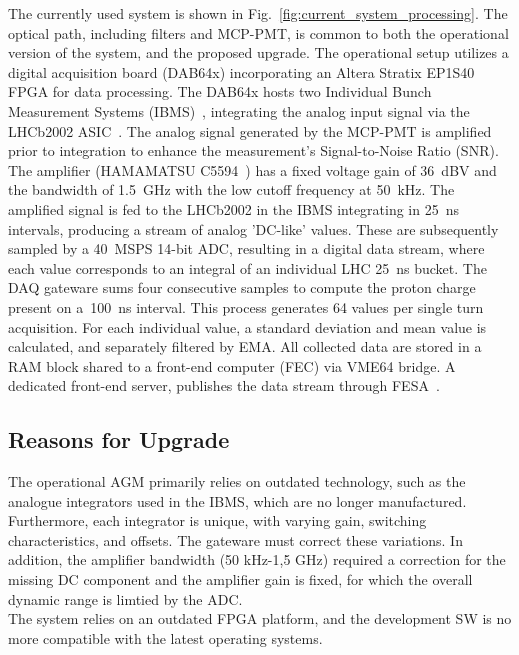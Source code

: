 The currently used system is shown in Fig.~\ref{fig:current_system_processing}.
%
The optical path, including filters and MCP-PMT, is common to both the operational version of the system, and the proposed upgrade.
The operational setup utilizes a digital acquisition board (DAB64x) incorporating an Altera Stratix EP1S40 FPGA for data processing.
%
The DAB64x hosts two Individual Bunch Measurement Systems (IBMS)~\cite{ibms}, integrating the analog input signal via the LHCb2002 ASIC~\cite{lhcb_asic}.
%
The analog signal generated by  the MCP-PMT is amplified  prior to integration to  enhance the measurement's Signal-to-Noise Ratio  (SNR).
%
The amplifier (HAMAMATSU C5594~\cite{bsra_first_operation}) has a fixed voltage gain of \SI{36}{dBV} and the bandwidth of \SI{1.5}{GHz} with the low cutoff frequency at \SI{50}{kHz}.
%
The amplified signal is fed to the LHCb2002 in the IBMS integrating in \SI{25}{\nano\second} intervals, producing a stream of analog  'DC-like' values.
%
These are subsequently sampled by a \SI{40}{MSPS} 14-bit ADC, resulting in a digital data stream, where each value corresponds to an integral of an individual LHC \SI{25}{ns} bucket.
%
The DAQ gateware sums four consecutive samples to compute the
proton charge present on a~\SI{100}{ns} interval.
%
This process generates 64 values per single turn acquisition.
%
For each individual value, a standard deviation and mean value is calculated, and separately filtered by EMA. 
%
All collected data are stored in a RAM block shared to a front-end computer (FEC) via VME64 bridge.
%
A dedicated  front-end  server, publishes the data stream through FESA~\cite{fesa}.


\subsection{Reasons for Upgrade}

The operational AGM primarily relies on outdated   technology, such as  the analogue integrators used in the IBMS,  which are no longer manufactured.
%
Furthermore, each integrator is unique, with varying gain, switching characteristics, and offsets. The gateware must correct these variations.
%
%
%
In addition, the amplifier bandwidth (50 kHz-1,5 GHz) %
required a correction for the missing DC component and the amplifier gain is fixed,  for which  the overall dynamic range is limtied by the ADC. 
%
\\
The system relies on an outdated FPGA platform, and the development SW is no more compatible with the latest operating systems. 


